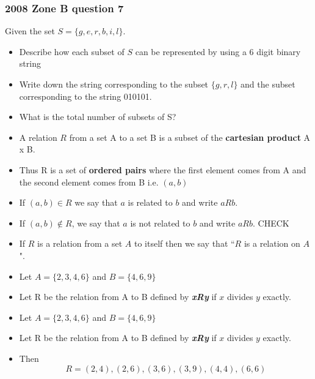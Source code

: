 \documentclass{article}
\begin{document}
\subsubsection*{2008 Zone B question 7}
Given the set $S =\{g,e,r,b,i,l\}$.
\begin{itemize}
\item Describe how each subset of $S$ can be represented by using a 6 digit binary string
\item Write down the string corresponding to the subset $\{g,r,l\}$ and the subset corresponding to the string 010101.
\item What is the total number of subsets of S?
\end{itemize}


\large
\begin{itemize}
\item A relation $R$ from a set A to a set B is a subset of the
\textbf{cartesian product} A x B. 
\item Thus R is a set of \textbf{ordered pairs} where
the first element comes from A and the second element comes
from B i.e. $(a, b)$
\end{itemize}

\large
\begin{itemize}

\item  If $(a, b) \in R$ we say that $a$ is related to $b$ and write $aRb$.
\item If $(a, b) \notin R$, we say that $a$ is not related to $b$ and write $aRb$. CHECK
\item If
$R$ is a relation from a set $A$ to itself then we say that ``$R$ is a relation
on $A$".

\item Let $A = \{2, 3, 4, 6\}$ and $B = \{4, 6, 9\}$
\item Let R be the relation from A to B defined by \textit{\textbf{xRy}} if $x$
divides $y$ exactly.


\item Let $A = \{2, 3, 4, 6\}$ and $B = \{4, 6, 9\}$
\item Let R be the relation from A to B defined by \textit{\textbf{xRy}} if $x$
divides $y$ exactly.
\item  Then
\[R = {(2, 4), (2, 6), (3, 6), (3, 9), (4, 4), (6, 6)}\]
\end{itemize}
\end{document}
